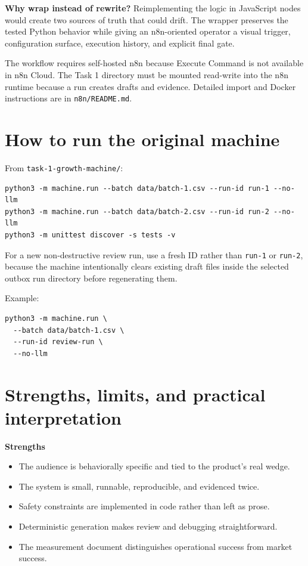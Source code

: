 \documentclass[11pt,a4paper]{article}
\newcommand{\pathcode}[1]{\texttt{#1}}
\begin{document}
\begin{center}
\colorbox{Soft}{\parbox{0.91\textwidth}{
\textbf{Why wrap instead of rewrite?} Reimplementing the logic in JavaScript nodes would create two sources of truth that could drift. The wrapper preserves the tested Python behavior while giving an n8n-oriented operator a visual trigger, configuration surface, execution history, and explicit final gate.
}}
\end{center}

The workflow requires self-hosted n8n because Execute Command is not available in n8n Cloud. The Task 1 directory must be mounted read-write into the n8n runtime because a run creates drafts and evidence. Detailed import and Docker instructions are in \pathcode{n8n/README.md}.

\section{How to run the original machine}

From \pathcode{task-1-growth-machine/}:

\begin{lstlisting}
python3 -m machine.run --batch data/batch-1.csv --run-id run-1 --no-llm
python3 -m machine.run --batch data/batch-2.csv --run-id run-2 --no-llm
python3 -m unittest discover -s tests -v
\end{lstlisting}

For a new non-destructive review run, use a fresh ID rather than \pathcode{run-1} or \pathcode{run-2}, because the machine intentionally clears existing draft files inside the selected outbox run directory before regenerating them.

Example:

\begin{lstlisting}
python3 -m machine.run \
  --batch data/batch-1.csv \
  --run-id review-run \
  --no-llm
\end{lstlisting}

\section{Strengths, limits, and practical interpretation}

\textbf{Strengths}
\begin{itemize}
  \item The audience is behaviorally specific and tied to the product's real wedge.
  \item The system is small, runnable, reproducible, and evidenced twice.
  \item Safety constraints are implemented in code rather than left as prose.
  \item Deterministic generation makes review and debugging straightforward.
  \item The measurement document distinguishes operational success from market success.
\end{itemize}
\end{document}
